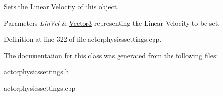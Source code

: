 Sets the Linear Velocity of this object. 


\begin{DoxyParams}{Parameters}
{\em LinVel} & \hyperlink{classphys_1_1Vector3}{Vector3} representing the Linear Velocity to be set. \\
\hline
\end{DoxyParams}


Definition at line 322 of file actorphysicssettings.cpp.



The documentation for this class was generated from the following files:\begin{DoxyCompactItemize}
\item 
actorphysicssettings.h\item 
actorphysicssettings.cpp\end{DoxyCompactItemize}
